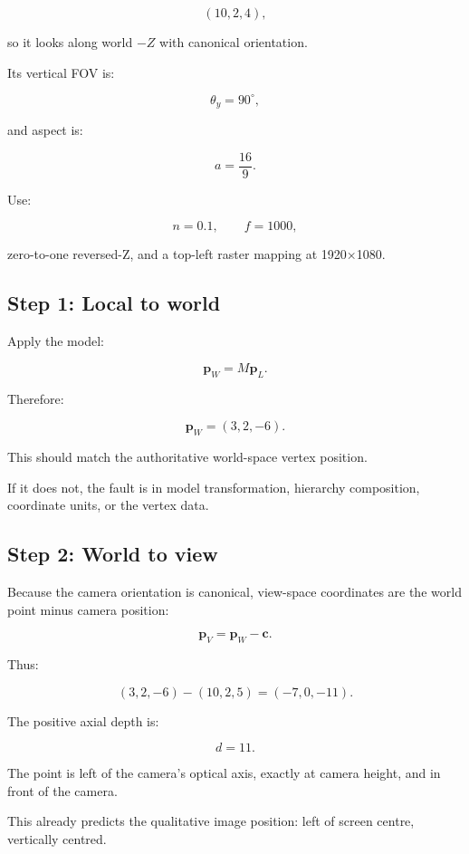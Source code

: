 \[ (10,2,4), \]

so it looks along world \(-Z\) with canonical orientation.

Its vertical FOV is:

\[ \theta_y=90^\circ, \]

and aspect is:

\[ a=\frac{16}{9}. \]

Use:

\[ n=0.1,\qquad f=1000, \]

zero-to-one reversed-Z, and a top-left raster mapping at 1920×1080.

\subsection{Step 1: Local to world}\label{02-foundations-ii-ch037-step-1-local-to-world}

\hypertarget{02-foundations-ii-ch037-step-1-local-to-world}{}

Apply the model:

\[ \mathbf p_W=M\mathbf p_L. \]

Therefore:

\[ \boxed{ \mathbf p_W=(3,2,-6). } \]

This should match the authoritative world-space vertex position.

If it does not, the fault is in model transformation, hierarchy composition, coordinate units, or the vertex data.

\subsection{Step 2: World to view}\label{02-foundations-ii-ch037-step-2-world-to-view}

\hypertarget{02-foundations-ii-ch037-step-2-world-to-view}{}

Because the camera orientation is canonical, view-space coordinates are the world point minus camera position:

\[ \mathbf p_V=\mathbf p_W-\mathbf c. \]

Thus:

\[ (3,2,-6)-(10,2,5) = \boxed{(-7,0,-11)}. \]

The positive axial depth is:

\[ \boxed{d=11}. \]

The point is left of the camera's optical axis, exactly at camera height, and in front of the camera.

This already predicts the qualitative image position: left of screen centre, vertically centred.

